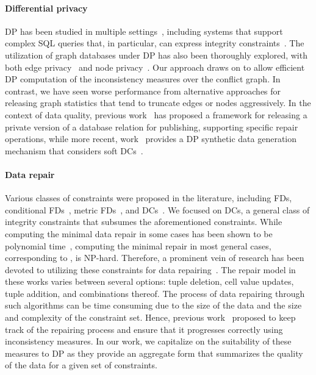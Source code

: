 \paragraph{Differential privacy}
DP has been studied in multiple settings~\cite{johnson2017practical,kotsogiannis2019privatesql,wilson2019differentially,johnson2018towards,DBLP:journals/pvldb/McKennaMHM18,tao2020computing}, including systems that support complex SQL queries that, in particular, can express integrity constraints~\cite{dong2022r2t}. The utilization of graph databases under DP has also been thoroughly explored, with both edge privacy~\cite{hay2009accurate, karwa2011private,karwa2012differentially,sala2011sharing,karwa2014differentially,zhang2015private} and node privacy~\cite{KasiviswanathanNRS13,blocki2013differentially,day2016publishing}. 
Our approach draws on \cite{day2016publishing} to allow efficient DP computation of the inconsistency measures over the conflict graph. In contrast, we have seen worse performance from alternative approaches for releasing graph statistics that tend to truncate edges or nodes aggressively. 
In the context of data quality, previous work~\cite{KrishnanWFGK16} has proposed a framework for releasing a private version of a database relation for publishing, supporting specific repair operations, while more recent, work~\cite{GeMHI21} provides a DP synthetic data generation mechanism that considers soft DCs~\cite{ChomickiM05}. 


\paragraph{Data repair}
Various classes of constraints were proposed in the literature, including FDs, conditional FDs~\cite{bohannon2007conditional}, metric FDs~\cite{koudas2009metric}, and DCs~\cite{ChomickiM05}. We focused on DCs, a general class of integrity constraints that subsumes the aforementioned constraints. 
While computing the minimal data repair in some cases has been shown to be polynomial time~\cite{LivshitsKR20}, computing the minimal repair in most general cases, corresponding to \repair, is NP-hard. 
Therefore, a prominent vein of research has been devoted to utilizing these constraints for data repairing~\cite{Afrati2009,RekatsinasCIR17,ChuIP13,BertossiKL13,FaginKK15,LivshitsKR20,GiladDR20,GeertsMPS13}. The repair model in these works varies between several options: tuple deletion, cell value updates, tuple addition, and combinations thereof. 
The process of data repairing through such algorithms can be time consuming due to the size of the data and the size and complexity of the constraint set. 
Hence, previous work~\cite{LivshitsBKS20,LivshitsKTIKR21} proposed to keep track of the repairing process and ensure that it progresses correctly using inconsistency measures. 
In our work, we capitalize on the suitability of these measures to DP as they provide an aggregate form that summarizes the quality of the data for a given set of constraints.  
